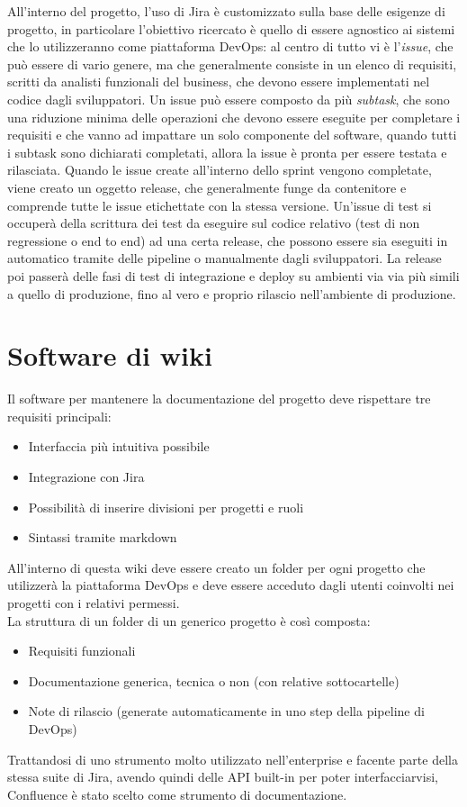 \documentclass[a4paper, 12pt]{report}
\numberwithin{equation}{section}
\begin{document}
All’interno del progetto, l’uso di Jira è customizzato sulla base delle esigenze di progetto, in particolare l’obiettivo ricercato è quello di essere agnostico ai sistemi che lo utilizzeranno come piattaforma DevOps: al centro di tutto vi è l’\emph{issue}, che può essere di vario genere, ma che generalmente consiste in un elenco di requisiti, scritti da analisti funzionali del business, che devono essere implementati nel codice dagli sviluppatori. Un issue può essere composto da più \emph{subtask}, che sono una riduzione minima delle operazioni che devono essere eseguite per completare i requisiti e che vanno ad impattare un solo componente del software, quando tutti i subtask sono dichiarati completati, allora la issue è pronta per essere testata e rilasciata. Quando le issue create all’interno dello sprint vengono completate, viene creato un oggetto release, che generalmente funge da contenitore e comprende tutte le issue etichettate con la stessa versione. Un’issue di test si occuperà della scrittura dei test da eseguire sul codice relativo (test di non regressione o end to end) ad una certa release, che possono essere sia eseguiti in automatico tramite delle pipeline o manualmente dagli sviluppatori. La release poi passerà delle fasi di test di integrazione e deploy su ambienti via via più simili a quello di produzione, fino al vero e proprio rilascio nell’ambiente di produzione.

\section{Software di wiki}
Il software per mantenere la documentazione del progetto deve rispettare tre requisiti principali:
\begin{itemize}
    \item Interfaccia più intuitiva possibile
    \item Integrazione con Jira
    \item Possibilità di inserire divisioni per progetti e ruoli
    \item Sintassi tramite markdown
\end{itemize}
All’interno di questa wiki deve essere creato un folder per ogni progetto che utilizzerà la piattaforma DevOps e deve essere acceduto dagli utenti coinvolti nei progetti con i relativi permessi. \\
La struttura di un folder di un generico progetto è così composta:
\begin{itemize}
    \item Requisiti funzionali
    \item Documentazione generica, tecnica o non (con relative sottocartelle)
    \item Note di rilascio (generate automaticamente in uno step della pipeline di DevOps)
\end{itemize}
Trattandosi di uno strumento molto utilizzato nell’enterprise e facente parte della stessa suite di Jira, avendo quindi delle API built-in per poter interfacciarvisi, Confluence è stato scelto come strumento di documentazione.
\end{document}
